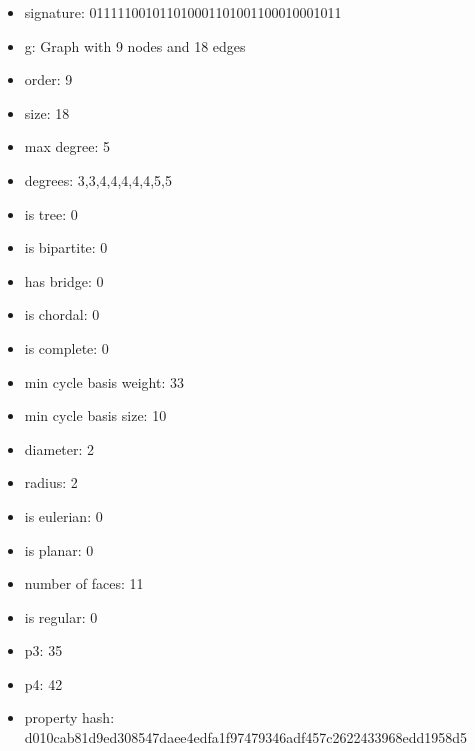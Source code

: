 \newpage
\begin{figure}
\end{figure}
\begin{itemize}
\item signature: 011111001011010001101001100010001011
\item g: Graph with 9 nodes and 18 edges
\item order: 9
\item size: 18
\item max degree: 5
\item degrees: 3,3,4,4,4,4,4,5,5
\item is tree: 0
\item is bipartite: 0
\item has bridge: 0
\item is chordal: 0
\item is complete: 0
\item min cycle basis weight: 33
\item min cycle basis size: 10
\item diameter: 2
\item radius: 2
\item is eulerian: 0
\item is planar: 0
\item number of faces: 11
\item is regular: 0
\item p3: 35
\item p4: 42
\item property hash: d010cab81d9ed308547daee4edfa1f97479346adf457c2622433968edd1958d5
\end{itemize}
